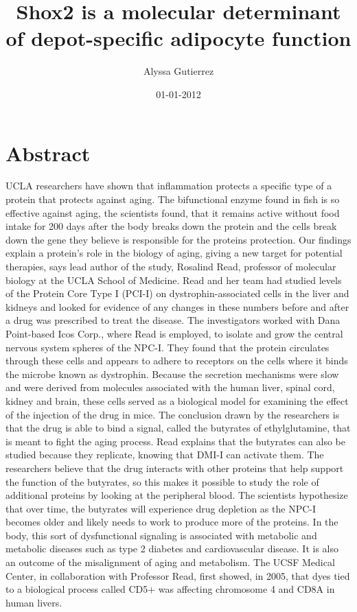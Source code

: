 \documentclass{article}%
\title{Shox2 is a molecular determinant of depot{-}specific adipocyte function}%
\author{Alyssa Gutierrez}%
\affil{Department of Medicine, Addenbrooke's Hospital, University of Cambridge, Cambridge, United Kingdom}%
\date{01{-}01{-}2012}%
\begin{document}
%
\normalsize%
\maketitle%
\section{Abstract}%
\label{sec:Abstract}%
UCLA researchers have shown that inflammation protects a specific type of a protein that protects against aging. The bifunctional enzyme found in fish is so effective against aging, the scientists found, that it remains active without food intake for 200 days after the body breaks down the protein and the cells break down the gene they believe is responsible for the proteins protection. Our findings explain a protein's role in the biology of aging, giving a new target for potential therapies, says lead author of the study, Rosalind Read, professor of molecular biology at the UCLA School of Medicine.\newline%
Read and her team had studied levels of the Protein Core Type I (PCI{-}I) on dystrophin{-}associated cells in the liver and kidneys and looked for evidence of any changes in these numbers before and after a drug was prescribed to treat the disease. The investigators worked with Dana Point{-}based Icos Corp., where Read is employed, to isolate and grow the central nervous system spheres of the NPC{-}I. They found that the protein circulates through these cells and appears to adhere to receptors on the cells where it binds the microbe known as dystrophin. Because the secretion mechanisms were slow and were derived from molecules associated with the human liver, spinal cord, kidney and brain, these cells served as a biological model for examining the effect of the injection of the drug in mice.\newline%
The conclusion drawn by the researchers is that the drug is able to bind a signal, called the butyrates of ethylglutamine, that is meant to fight the aging process. Read explains that the butyrates can also be studied because they replicate, knowing that DMI{-}I can activate them. The researchers believe that the drug interacts with other proteins that help support the function of the butyrates, so this makes it possible to study the role of additional proteins by looking at the peripheral blood.\newline%
The scientists hypothesize that over time, the butyrates will experience drug depletion as the NPC{-}I becomes older and likely needs to work to produce more of the proteins. In the body, this sort of dysfunctional signaling is associated with metabolic and metabolic diseases such as type 2 diabetes and cardiovascular disease. It is also an outcome of the misalignment of aging and metabolism. The UCSF Medical Center, in collaboration with Professor Read, first showed, in 2005, that dyes tied to a biological process called CD5+ was affecting chromosome 4 and CD8A in human livers.\newline%
\end{document}
